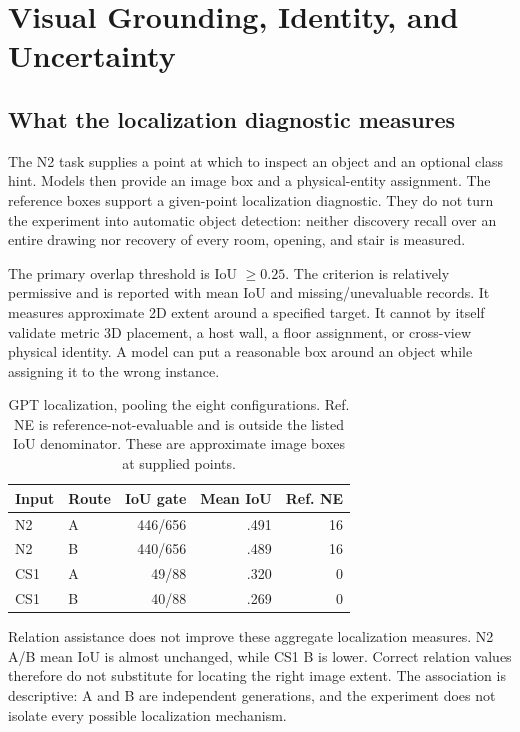 \section{Visual Grounding, Identity, and Uncertainty}\label{app:G}
\subsection{What the localization diagnostic measures}
The N2 task supplies a point at which to inspect an object and an optional class hint. Models then provide an image box and a physical-entity assignment. The reference boxes support a given-point localization diagnostic. They do not turn the experiment into automatic object detection: neither discovery recall over an entire drawing nor recovery of every room, opening, and stair is measured.

The primary overlap threshold is IoU $\geq0.25$. The criterion is relatively permissive and is reported with mean IoU and missing/unevaluable records. It measures approximate 2D extent around a specified target. It cannot by itself validate metric 3D placement, a host wall, a floor assignment, or cross-view physical identity. A model can put a reasonable box around an object while assigning it to the wrong instance.

\begin{table}[htbp]\centering
\begin{tabular}{llrrr}\toprule Input & Route & IoU gate & Mean IoU & Ref. NE\\\midrule
N2 & A & 446/656 & .491 & 16\\
N2 & B & 440/656 & .489 & 16\\
CS1 & A & 49/88 & .320 & 0\\
CS1 & B & 40/88 & .269 & 0\\\bottomrule
\end{tabular}
\caption{GPT localization, pooling the eight configurations. Ref. NE is reference-not-evaluable and is outside the listed IoU denominator. These are approximate image boxes at supplied points.}\label{tab:G-grounding}
\end{table}

Relation assistance does not improve these aggregate localization measures. N2 A/B mean IoU is almost unchanged, while CS1 B is lower. Correct relation values therefore do not substitute for locating the right image extent. The association is descriptive: A and B are independent generations, and the experiment does not isolate every possible localization mechanism.

